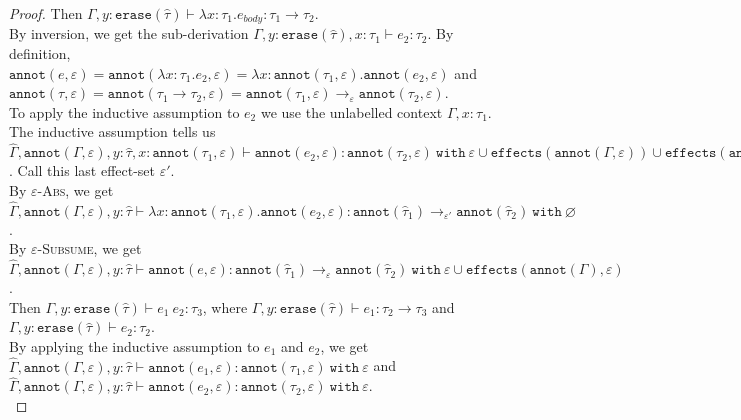 \documentclass{llncs}
\newcommand{\keywadj}[1]{\mathtt{#1}}
\newcommand{\keyw}[1]{\keywadj{#1}~}
\newcommand{\kw}[1]{\keyw{ #1 }}
\newcommand{\kwa}[1]{\keywadj{ #1 }}
\begin{document}
\begin{proof}
\noindent
{} Then $\Gamma, y: \kwa{erase}(\hat \tau) \vdash \lambda x: \tau_1.e_{body} : \tau_1 \rightarrow \tau_2$. \\

\noindent
By inversion, we get the sub-derivation $\Gamma, y: \kwa{erase}(\hat \tau), x:\tau_1  \vdash e_2: \tau_2$. By definition, $\kwa{annot}(e, \varepsilon) = \kwa{annot}(\lambda x: \tau_1.e_2, \varepsilon) = \lambda x: \kwa{annot}(\tau_1, \varepsilon).\kwa{annot}(e_2, \varepsilon)$ and $\kwa{annot}(\tau, \varepsilon) = \kwa{annot}(\tau_1 \rightarrow \tau_2, \varepsilon) = \kwa{annot}(\tau_1, \varepsilon) \rightarrow_{\varepsilon} \kwa{annot}(\tau_2, \varepsilon)$. \\

\noindent
To apply the inductive assumption to $e_2$ we use the unlabelled context $\Gamma, x: \tau_1$. The inductive assumption tells us $\hat \Gamma, \kwa{annot}(\Gamma, \varepsilon), y: \hat \tau, x: \kwa{annot}(\tau_1, \varepsilon) \vdash \kwa{annot}(e_2, \varepsilon): \kwa{annot}(\tau_2, \varepsilon)~\kw{with} \varepsilon \cup \kwa{effects}(\kwa{annot}(\Gamma, \varepsilon)) \cup \kwa{effects}(\kwa{annot}(\tau_1, \varepsilon))$. Call this last effect-set $\varepsilon'$. \\

\noindent
By \textsc{$\varepsilon$-Abs}, we get $\hat \Gamma, \kwa{annot}(\Gamma, \varepsilon), y: \hat \tau \vdash \lambda x: \kwa{annot}(\tau_1, \varepsilon) . \kwa{annot}(e_2, \varepsilon) : \kwa{annot}(\hat \tau_1) \rightarrow_{\varepsilon'} \kwa{annot}(\hat \tau_2)~\kw{with} \varnothing$. \\

\noindent
By \textsc{$\varepsilon$-Subsume}, we get $\hat \Gamma, \kwa{annot}(\Gamma, \varepsilon), y: \hat \tau \vdash \kwa{annot}(e, \varepsilon) : \kwa{annot}(\hat \tau_1) \rightarrow_{\varepsilon} \kwa{annot}(\hat \tau_2)~\kw{with} \varepsilon \cup \kwa{effects}(\kwa{annot}(\Gamma), \varepsilon) $. \\

\noindent
{} Then $\Gamma, y: \kwa{erase}(\hat \tau) \vdash e_1~e_2: \tau_3$, where $\Gamma, y:\kwa{erase}(\hat \tau) \vdash e_1: \tau_2 \rightarrow \tau_3$ and $\Gamma, y: \kwa{erase}(\hat \tau) \vdash e_2: \tau_2$. \\

\noindent
By applying the inductive assumption to $e_1$ and $e_2$, we get $\hat \Gamma, \kwa{annot}(\Gamma, \varepsilon), y: \hat \tau \vdash \kwa{annot}(e_1, \varepsilon): \kwa{annot}(\tau_1, \varepsilon)~\kw{with} \varepsilon$ and $\hat \Gamma, \kwa{annot}(\Gamma, \varepsilon), y: \hat \tau \vdash \kwa{annot}(e_2, \varepsilon): \kwa{annot}(\tau_2, \varepsilon)~\kw{with} \varepsilon$. \\


\end{proof}
\end{document}
